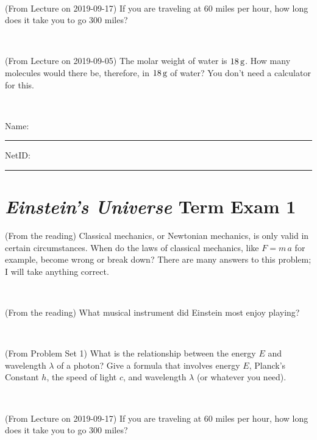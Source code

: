 \documentclass[12pt, letterpaper]{article}
\begin{document}
\vfill ~

\begin{problem} (From Lecture on 2019-09-17)
If you are traveling at 60 miles per hour, how long does
it take you to go 300 miles?
\end{problem}


\vfill ~

\begin{problem} (From Lecture on 2019-09-05)
The molar weight of water is $18\,\mathrm{g}$. How many molecules would there
be, therefore, in $18\,\mathrm{g}$ of water? You don't need a calculator for
this.
\end{problem}


\vfill ~


\cleardoublepage



\noindent
Name: \rule[-1ex]{0.60\textwidth}{0.1pt}
NetID: \rule[-1ex]{0.20\textwidth}{0.1pt}

\section*{\textsl{Einstein's Universe} Term Exam 1}
\setcounter{problem}{1}


\begin{problem} (From the reading)
Classical mechanics, or Newtonian mechanics, is only valid in certain
circumstances. When do the laws of classical mechanics, like $F =
m\,a$ for example, become wrong or break down? There are many answers
to this problem; I will take anything correct.
\end{problem}


\vfill ~

\begin{problem} (From the reading)
What musical instrument did Einstein most enjoy playing?
\end{problem}


\vfill ~

\begin{problem} (From Problem Set 1)
What is the relationship between the energy $E$ and wavelength
$\lambda$ of a photon? Give a formula that involves energy $E$,
Planck's Constant $h$, the speed of light $c$, and wavelength
$\lambda$ (or whatever you need).
\end{problem}

\vfill ~

\begin{problem} (From Lecture on 2019-09-17)
If you are traveling at 60 miles per hour, how long does
it take you to go 300 miles?
\end{problem}
\end{document}

